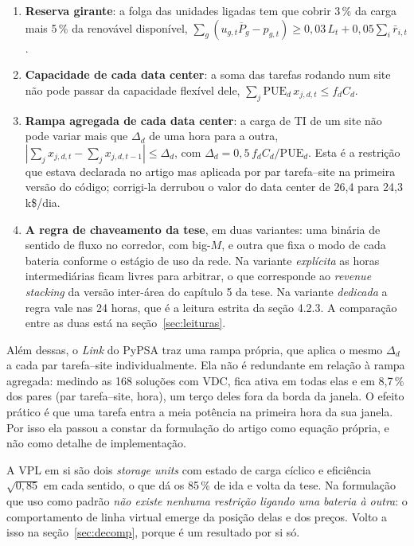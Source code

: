 \documentclass[11pt,a4paper]{article}
\begin{document}
\begin{enumerate}
\item \textbf{Reserva girante}: a folga das unidades ligadas tem que cobrir 3\,\% da carga mais 5\,\% da
renovável disponível,
$\sum_g (u_{g,t}\overline{P}_g - p_{g,t}) \ge 0{,}03\,L_t + 0{,}05\sum_i \bar r_{i,t}$.
\item \textbf{Capacidade de cada data center}: a soma das tarefas rodando num site não pode passar da
capacidade flexível dele, $\sum_j \mathrm{PUE}_d\,x_{j,d,t} \le f_d C_d$.
\item \textbf{Rampa agregada de cada data center}: a carga de TI de um site não pode variar mais que
$\Delta_d$ de uma hora para a outra, $\left|\sum_j x_{j,d,t} - \sum_j x_{j,d,t-1}\right| \le \Delta_d$,
com $\Delta_d = 0{,}5\,f_d C_d/\mathrm{PUE}_d$. Esta é a restrição que estava declarada no artigo mas
aplicada por par tarefa--site na primeira versão do código; corrigi-la derrubou o valor do data center
de 26{,}4 para 24{,}3\,k\$/dia.
\item \textbf{A regra de chaveamento da tese}, em duas variantes: uma binária de sentido de fluxo no
corredor, com big-$M$, e outra que fixa o modo de cada bateria conforme o estágio de uso da rede. Na
variante \emph{explícita} as horas intermediárias ficam livres para arbitrar, o que corresponde ao
\emph{revenue stacking} da versão inter-área do capítulo 5 da tese. Na variante \emph{dedicada} a regra
vale nas 24 horas, que é a leitura estrita da seção 4.2.3. A comparação entre as duas está na
seção~\ref{sec:leituras}.
\end{enumerate}

Além dessas, o \emph{Link} do PyPSA traz uma rampa própria, que aplica o mesmo $\Delta_d$ a cada par
tarefa--site individualmente. Ela não é redundante em relação à rampa agregada: medindo as 168
soluções com VDC, fica ativa em todas elas e em 8{,}7\,\% dos pares (par tarefa--site, hora), um terço
deles fora da borda da janela. O efeito prático é que uma tarefa entra a meia potência na primeira
hora da sua janela. Por isso ela passou a constar da formulação do artigo como equação própria, e
não como detalhe de implementação.

A VPL em si são dois \emph{storage units} com estado de carga cíclico e eficiência $\sqrt{0{,}85}$ em cada
sentido, o que dá os 85\,\% de ida e volta da tese. Na formulação que uso como padrão \emph{não existe
nenhuma restrição ligando uma bateria à outra}: o comportamento de linha virtual emerge da posição delas e
dos preços. Volto a isso na seção~\ref{sec:decomp}, porque é um resultado por si só.
\end{document}
